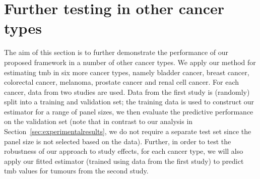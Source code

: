 \documentclass[../thesis.tex]{subfiles}
\begin{document}
\section{Further testing in other cancer types \label{sec:robust}} 

{The aim of this section is to further demonstrate the performance of our proposed framework in a number of other cancer types.  We apply our method for estimating \gls{tmb} in six more cancer types, namely bladder cancer, breast cancer, colorectal cancer, melanoma, prostate cancer and renal cell cancer.  For each cancer, data from two studies are used.  Data from the first study is (randomly) split into a training and validation set; the training data is used to construct our estimator for a range of panel sizes, we then evaluate the predictive performance on the validation set (note that in contrast to our analysis in Section~\ref{sec:experimentalresults}, we do not require a separate test set since the panel size is not selected based on the data). Further, in order to test the robustness of our approach to study effects, for each cancer type, we will also apply our fitted estimator (trained using data from the first study) to predict \gls{tmb} values for tumours from the second study.}
\end{document}
